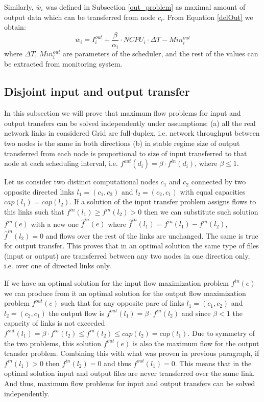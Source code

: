 \documentclass[english]{ddny}
\begin{document}
Similarly, $\overline{w}_{i}$ was defined in Subsection \ref{out_problem} as maximal amount of output data which can be transferred from node $c_{i}$. From Equation \ref{delOut} we obtain:
\begin{equation}
\label{sigma}
\overline{w}_{i} = I_{i}^{out} + \frac{\beta}{\alpha_{i}} \cdot NCPU_{i} \cdot \Delta T - Min_{i}^{out}
\end{equation}  
where $\Delta T$,  $Min_{i}^{out}$ are parameters of the scheduler, and the rest of the values can be extracted from monitoring system.

\subsection{Disjoint input and output transfer}
In this subsection we will prove that maximum flow problems for input and output transfers can be solved independently under assumptions: (a) all the real network links in considered Grid are full-duplex, i.e. network throughput between two nodes is the same in both directions (b) in stable regime size of output transferred from each node is proportional to size of input transferred to that node at each scheduling interval, i.e. $f^{out}(\overline{d}_{i})= \beta \cdot f^{in}(d_{i})$, where $\beta \leq 1$.

Let us consider two distinct computational nodes $c_{1}$ and $c_{2}$ connected by two opposite directed links $l_{1}=(c_{1},c_{2})$ and $l_{2}=(c_{2},c_{1})$ with equal capacities $cap(l_{1})=cap(l_{2})$. If a solution of the input transfer problem assigns flows to this links such that $f^{in}(l_{1}) \geq f^{in}(l_{2}) > 0$ then we can substitute such solution $f^{in}(e)$ with a new one $\widehat{f}^{in}(e)$ where $\widehat{f}^{in}(l_{1}) = f^{in}(l_{1}) - f^{in}(l_{2})$, $\widehat{f}^{in}(l_{2}) = 0$ and flows over the rest of the links are unchanged. The same is true for output transfer. This proves that in an optimal solution the same type of files (input or output) are transferred between any two nodes in one direction only, i.e. over one of directed links only. 

If we have an optimal solution for the input flow maximization problem $f^{in}(e)$ we can produce from it an optimal solution for the output flow maximization problem $f^{out}(e)$ such that for any opposite pare of links $l_{1}=(c_{1},c_{2})$ and $l_{2}=(c_{2},c_{1})$ the output flow is $f^{out}({l_{1}}) = \beta \cdot f^{in}({l_{2}})$ and since $\beta < 1$ the capacity of links is not exceeded  $f^{out}({l_{1}}) =\beta \cdot f^{in}(l_{2}) \leq f^{in}(l_{2}) \leq cap(l_{2}) = cap(l_{1})$. Due to symmetry of the two problems, this solution  $f^{out}(e)$ is also the maximum flow for the output transfer problem. Combining this with what was proven in previous paragraph, if $f^{in}({l_{1}}) > 0$ then $f^{in}({l_{2}}) = 0$ and thus $f^{out}({l_{1}}) = 0$. This means that in the optimal solution input and output files are never transferred over the same link. And thus, maximum flow problems for input and output transfers can be solved independently. 
\end{document}
